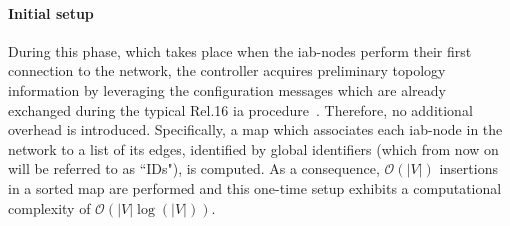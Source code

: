\paragraph{Initial setup}
During this phase, which takes place when the \gls{iab}-nodes perform their first connection to the network, the controller acquires preliminary topology information by leveraging the configuration messages which are already exchanged during the typical Rel.16 \gls{ia} procedure~\cite[Section 9.6]{3gpp_38_874}. Therefore, no additional overhead is introduced. 
Specifically, a map which associates each \gls{iab}-node in the network to a list of its edges, identified by global identifiers (which from now on will be referred to as ``IDs"), is computed. %
As a consequence, $\mathcal{O} \left( \vert V \vert \right) $ insertions in a sorted map are performed and this one-time setup exhibits a computational complexity of $\mathcal{O} \left( \vert V \vert \log( \vert V \vert ) \right) $.

